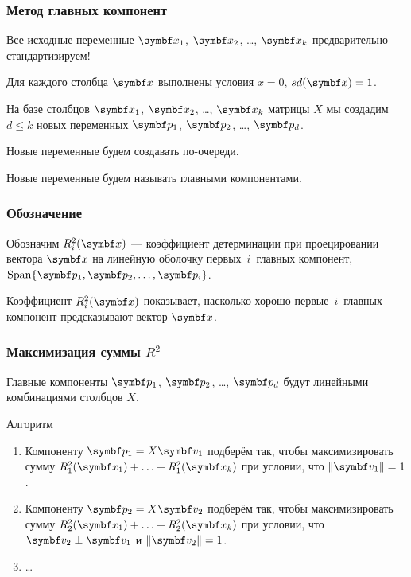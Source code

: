 \begin{frame}
  \frametitle{Метод главных компонент}

  Все исходные переменные $\bx_1$, $\bx_2$, \ldots, $\bx_k$ предварительно стандартизируем! 

  Для каждого столбца $\bx$ выполнены условия $\bar x =0$, $sd(\bx)=1$. 


  На базе столбцов $\bx_1$, $\bx_2$, \ldots, $\bx_k$ матрицы $X$ мы создадим 
  $d\leq k$ новых переменных $\bp_1$, $\bp_2$, \ldots, $\bp_d$. 

  Новые переменные будем создавать по-очереди. 

  Новые переменные будем называть \alert{главными компонентами}.


\end{frame}

\begin{frame}
  \frametitle{Обозначение}


  Обозначим $R^2_i(\bx)$ —
  коэффициент детерминации при проецировании вектора $\bx$ на 
  линейную оболочку первых~$i$~главных компонент, $\Span \{ \bp_1, \bp_2, \ldots, \bp_i  \}$. \pause


  Коэффициент $R^2_i(\bx)$ показывает, насколько хорошо первые~$i$~главных компонент
  предсказывают вектор $\bx$. 

\end{frame}


\begin{frame}
  \frametitle{Максимизация суммы $R^2$}

  Главные компоненты $\bp_1$, $\bp_2$, \ldots, $\bp_d$ будут линейными 
  комбинациями столбцов $X$. \pause

  \begin{block}{Алгоритм}
    \begin{enumerate}
      \item Компоненту $\bp_1 = X \bv_1$ подберём так, чтобы 
     максимизировать сумму $R_1^2(\bx_1) + \ldots + R_1^2(\bx_k)$ 
     при условии, что $\norm{\bv_1}=1$. \pause
\item Компоненту $\bp_2 = X \bv_2$ подберём так, чтобы 
максимизировать сумму $R_2^2(\bx_1) + \ldots + R_2^2(\bx_k)$ 
    при условии, что $\bv_2 \perp \bv_1$ и $\norm{\bv_2}=1$. 
      \item \ldots
    \end{enumerate}
    
  \end{block}
  

\end{frame}



